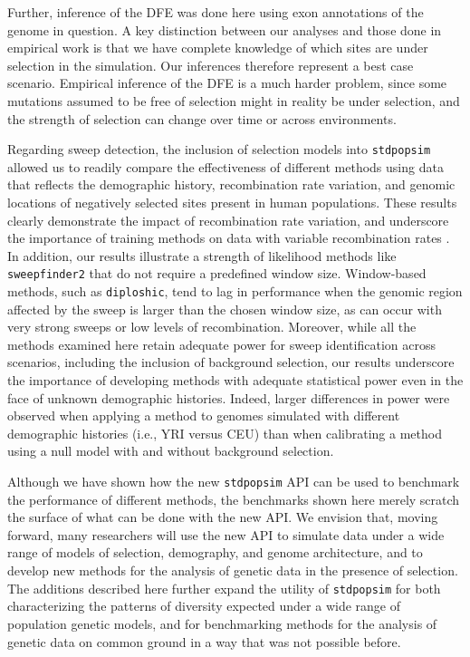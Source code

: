 \documentclass[hidelinks]{article}
\newcommand{\stdpopsim}{\texttt{stdpopsim}\xspace}
\newcommand{\sweepfinder}{\texttt{sweepfinder2}\xspace}
\newcommand{\diploshic}{\texttt{diploshic}\xspace}
\begin{document}
    Further, inference of the DFE was done here using exon annotations of the genome in question.
    A key distinction between our analyses and those done in empirical work 
    is that we have complete knowledge of which sites are under selection in the simulation.
    Our inferences therefore represent a best case scenario. Empirical inference of the DFE is a much
    harder problem, since some mutations assumed to be free of selection
    might in reality be under selection, and the strength of selection can change over time or across environments.

    Regarding sweep detection, the inclusion of selection models into \stdpopsim allowed us to readily compare the
    effectiveness of different methods using data that reflects the demographic history, recombination rate variation,
    and genomic locations of negatively selected sites present in human populations. These results clearly demonstrate
    the impact of recombination rate variation, and underscore the importance of training methods on data with variable
    recombination rates \citep[e.g.,][]{schrider2017soft}. In addition, our results
    illustrate a strength of likelihood methods like \sweepfinder that do not require a predefined window size.
    Window-based methods, such as \diploshic, tend to lag in performance when the genomic region affected by the sweep is
    larger than the chosen window size, as can occur with very strong sweeps or low levels of
    recombination. Moreover, while all the methods examined here retain adequate power for sweep identification across
    scenarios, including the inclusion of background selection, our results underscore the importance of developing
    methods with adequate statistical power even in the face of unknown demographic histories. Indeed, larger differences
    in power were observed when applying a method to genomes simulated with different demographic histories (i.e., YRI versus CEU)
    than when calibrating a method using a null model with and without background selection.

    Although we have shown how the new \stdpopsim API can be used to benchmark the performance of different methods,
    the benchmarks shown here merely scratch the surface of what can be done with the new API.
    We envision that, moving forward, many researchers will use
    the new API to simulate data under a wide range of models of selection, demography, and genome architecture, and to develop
    new methods for the analysis of genetic data in the presence of selection.
    The additions described here further expand the utility of \stdpopsim for both
    characterizing the patterns of diversity expected under a wide range of population genetic
    models, and for benchmarking methods for the analysis of genetic data
    on common ground in a way that was not possible before. 
\end{document}

